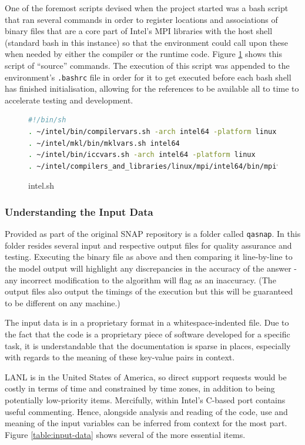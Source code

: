 \documentclass[conference]{IEEEtran}
\begin{document}
One of the foremost scripts devised when the project started was a bash script that ran several commands in order to register locations and associations of binary files that are a core part of Intel's MPI libraries with the host shell (standard bash in this instance) so that the environment could call upon these when needed by either the compiler or the runtime code. Figure \ref{fig:source_list} shows this script of ``source'' commands. The execution of this script was appended to the environment's \texttt{.bashrc} file in order for it to get executed before each bash shell has finished initialisation, allowing for the references to be available all to time to accelerate testing and development.

\begin{figure}[h]
    \centering
    \begin{lstlisting}[language=bash, breaklines]
#!/bin/sh
. ~/intel/bin/compilervars.sh -arch intel64 -platform linux
. ~/intel/mkl/bin/mklvars.sh intel64
. ~/intel/bin/iccvars.sh -arch intel64 -platform linux
. ~/intel/compilers_and_libraries/linux/mpi/intel64/bin/mpivars.sh 
    \end{lstlisting}
    \caption{intel.sh}
    \label{fig:source_list}
\end{figure}


\subsubsection{Understanding the Input Data}

Provided as part of the original SNAP repository is a folder called \texttt{qasnap}. In this folder resides several input and respective output files for quality assurance and testing. Executing the binary file as above and then comparing it line-by-line to the model output will highlight any discrepancies in the accuracy of the answer - any incorrect modification to the algorithm will flag as an inaccuracy. (The output files also output the timings of the execution but this will be guaranteed to be different on any machine.)

The input data is in a proprietary format in a whitespace-indented file. Due to the fact that the code is a proprietary piece of software developed for a specific task, it is understandable that the documentation is sparse in places, especially with regards to the meaning of these key-value pairs in context.

LANL is in the United States of America, so direct support requests would be costly in terms of time and constrained by time zones, in addition to being potentially low-priority items. Mercifully, within Intel's C-based port contains useful commenting. Hence, alongside analysis and reading of the code, use and meaning of the input variables can be inferred from context for the most part. Figure \ref{table:input-data} shows several of the more essential items. 
\end{document}
